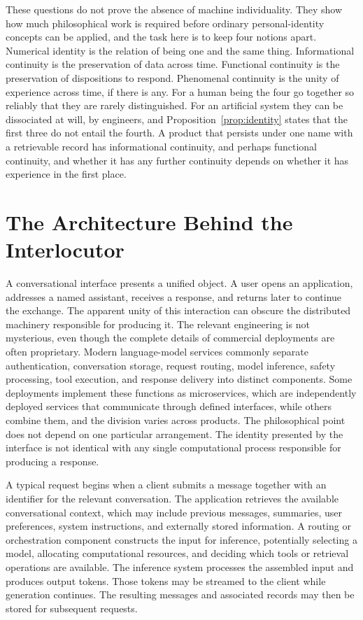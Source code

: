 \documentclass[12pt]{article}
\theoremstyle{definition}
\begin{document}
These questions do not prove the absence of machine individuality. They show how much philosophical work is required before ordinary personal-identity concepts can be applied, and the task here is to keep four notions apart. Numerical identity is the relation of being one and the same thing. Informational continuity is the preservation of data across time. Functional continuity is the preservation of dispositions to respond. Phenomenal continuity is the unity of experience across time, if there is any. For a human being the four go together so reliably that they are rarely distinguished. For an artificial system they can be dissociated at will, by engineers, and Proposition~\ref{prop:identity} states that the first three do not entail the fourth. A product that persists under one name with a retrievable record has informational continuity, and perhaps functional continuity, and whether it has any further continuity depends on whether it has experience in the first place.

\section{The Architecture Behind the Interlocutor}
\label{sec:architecture}

A conversational interface presents a unified object. A user opens an application, addresses a named assistant, receives a response, and returns later to continue the exchange. The apparent unity of this interaction can obscure the distributed machinery responsible for producing it. The relevant engineering is not mysterious, even though the complete details of commercial deployments are often proprietary. Modern language-model services commonly separate authentication, conversation storage, request routing, model inference, safety processing, tool execution, and response delivery into distinct components. Some deployments implement these functions as microservices, which are independently deployed services that communicate through defined interfaces, while others combine them, and the division varies across products. The philosophical point does not depend on one particular arrangement. The identity presented by the interface is not identical with any single computational process responsible for producing a response.

A typical request begins when a client submits a message together with an identifier for the relevant conversation. The application retrieves the available conversational context, which may include previous messages, summaries, user preferences, system instructions, and externally stored information. A routing or orchestration component constructs the input for inference, potentially selecting a model, allocating computational resources, and deciding which tools or retrieval operations are available. The inference system processes the assembled input and produces output tokens. Those tokens may be streamed to the client while generation continues. The resulting messages and associated records may then be stored for subsequent requests.
\end{document}
